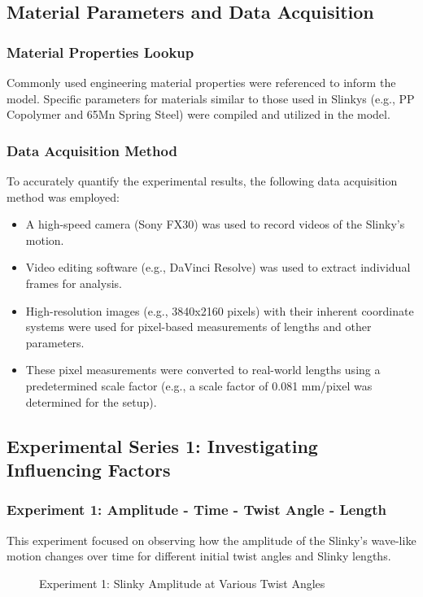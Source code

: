 \documentclass{mcmthesis}  %
\begin{document}
\subsection{Material Parameters and Data Acquisition}

\subsubsection{Material Properties Lookup}
Commonly used engineering material properties were referenced to inform the model. Specific parameters for materials similar to those used in Slinkys (e.g., PP Copolymer and 65Mn Spring Steel) were compiled and utilized in the model.

\subsubsection{Data Acquisition Method}
To accurately quantify the experimental results, the following data acquisition method was employed:
\begin{itemize}
    \item A high-speed camera (Sony FX30) was used to record videos of the Slinky's motion.
    \item Video editing software (e.g., DaVinci Resolve) was used to extract individual frames for analysis.
    \item High-resolution images (e.g., 3840x2160 pixels) with their inherent coordinate systems were used for pixel-based measurements of lengths and other parameters.
    \item These pixel measurements were converted to real-world lengths using a predetermined scale factor (e.g., a scale factor of 0.081 mm/pixel was determined for the setup).
\end{itemize}

\subsection{Experimental Series 1: Investigating Influencing Factors}

\subsubsection{Experiment 1: Amplitude - Time - Twist Angle - Length}
This experiment focused on observing how the amplitude of the Slinky's wave-like motion changes over time for different initial twist angles and Slinky lengths.

\begin{figure}[h!]
    \centering
    \caption{Experiment 1: Slinky Amplitude at Various Twist Angles}
    \label{fig:exp1_amplitude_twists}
\end{figure}
\end{document}
